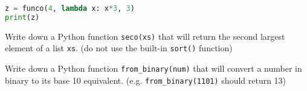 \documentclass[addpoints,12pt]{exam}
\newcommand{\code}[1]{{\texttt{#1}}}
\begin{document}
\begin{questions}
\begin{enumerate}
\begin{lstlisting}[language=python]
z = funco(4, lambda x: x*3, 3)
print(z)
\end{lstlisting}
\vfill

\end{enumerate}


\newpage
\question[20] Write down a Python function \code{seco(xs)} that will return the second largest element of a list \code{xs}. (do not use the built-in \code{sort()} function)


\newpage
\question[20] Write down a Python function \code{from\_binary(num)} that will convert a number in binary to its base 10 equivalent. (e.g. \code{from\_binary(1101)} should return 13) 
\end{questions}
\end{document}

